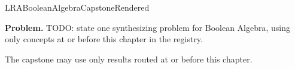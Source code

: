 \ifcsname LRABooleanAlgebraCapstoneRendered\endcsname
\else
\expandafter\gdef\csname LRABooleanAlgebraCapstoneRendered\endcsname{}

\newpage
{}
\label{cap:boolean-algebra}

\begin{tcolorbox}[
  colback=gray!6,
  colframe=gray!40,
  arc=2pt,
  left=8pt, right=8pt, top=6pt, bottom=6pt,
  title={\small\textbf{Capstone Problem}},
  fonttitle=\small\bfseries
]
\textbf{Problem.}
TODO: state one synthesizing problem for Boolean Algebra, using only concepts at or
before this chapter in the registry.
\end{tcolorbox}

\begin{remark*}
The capstone may use only results routed at or before this chapter.
\end{remark*}

\clearpage
\fi
